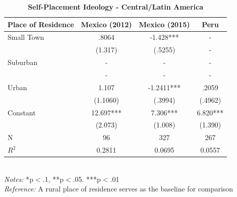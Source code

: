 \documentclass[12pt, titlepage]{article}
\newcommand\e{\emph}
\newcommand\tb{\textbf}
\begin{document}
\begin{singlespace}
	\begin{table}[H]
		\centering
		\caption{\tb{Self-Placement Ideology - Central/Latin America}}
		\begin{tabulary}{\linewidth}{l c c c}
			\\
			\hline
			\tb{Place of Residence}&\tb{Mexico (2012)}&\tb{Mexico (2015)} &\tb{Peru}\\
			\hline
			Small Town  & .8064   &-1.428***    & -   \\      
			 & (1.317) & (.5255)    & -    \\
			Suburban     & -   & -   & -    \\ 
			  & -    & -   & -    \\
			Urban    & 1.107  & -1.2411***   & .2059  \\
			  &(1.1060)   & (.3994)  & (.4962)      \\
			Constant  & 12.697*** & 7.306*** & 6.820***  \\
			&(2.073)&(1.008)&(1.390) \\
			N   &96   & 327 & 267   \\
			$R^2$ & 0.2811   &0.0695   &0.0557     \\
			\hline                   
		\end{tabulary} 
		\\
		\e{Notes:} *p$<$.1, **p$<$.05. ***p$<$.01 \\
		\e{Reference:} A rural place of residence serves as the baseline for comparison
		\label{table4}
	\end{table}
\end{singlespace}
\end{document}
